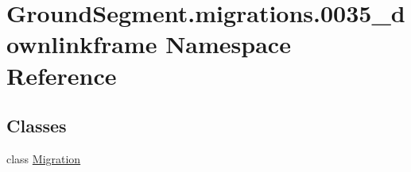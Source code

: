 \hypertarget{namespace_ground_segment_1_1migrations_1_10035__downlinkframe}{}\section{Ground\+Segment.\+migrations.0035\+\_\+downlinkframe Namespace Reference}
\label{namespace_ground_segment_1_1migrations_1_10035__downlinkframe}
\subsection*{Classes}
\begin{DoxyCompactItemize}
\item 
class \hyperlink{class_ground_segment_1_1migrations_1_10035__downlinkframe_1_1_migration}{Migration}
\end{DoxyCompactItemize}
